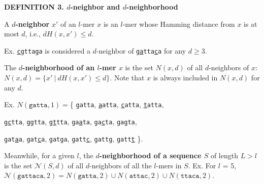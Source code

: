 \documentclass[oneside,12pt]{DISCSthesis}
\begin{document}
		\noindent\textbf{\boldmath DEFINITION 3. $d$-neighbor and $d$-neighborhood}
		
		\noindent A {\boldmath\bf $d$-neighbor} $x'$ of an $l$-mer $x$ is an $l$-mer whose Hamming distance from $x$ is at most $d$, i.e., {\boldmath $dH (x, x') \leq d$}.

		\noindent \hspace*{35pt} Ex. \texttt{\ul{cg}tta\ul{g}a} is considered a $d$-neighbor of \texttt{\ul{ga}tta\ul{c}a} for any $d \geq 3$.\newline

		\noindent The \textbf{\boldmath $d$-neighborhood of an $l$-mer $x$} is the set {\boldmath $N(x, d)$} of all $d$-neighbors of $x$: $N(x,d) = \{ x'\ |\ dH(x, x') \leq d\}$. Note that $x$ is always included in $N(x,d)$ for any $d$.\newline
		
		\noindent\begin{minipage}{\textwidth} {
				\noindent\hspace*{35pt} Ex. $N(\texttt{gatta}, 1) =$\{ \texttt{gatta},
					\texttt{\ul{a}atta}, \texttt{\ul{c}atta}, \texttt{\ul{t}atta},				
					
					\hspace*{150pt}\texttt{g\ul{c}tta}, \texttt{g\ul{g}tta}, \texttt{g\ul{t}tta},
					\texttt{ga\ul{a}ta}, \texttt{ga\ul{c}ta}, \texttt{ga\ul{g}ta},

				 	\hspace*{150pt}\texttt{gat\ul{a}a}, \texttt{gat\ul{c}a}, \texttt{gat\ul{g}a},
				 	\texttt{gatt\ul{c}}, \texttt{gatt\ul{g}}, \texttt{gatt\ul{t}} \}.

		}\end{minipage}\newline

		\noindent Meanwhile, for a given $l$, the \textbf{\boldmath $d$-neighborhood of a sequence $S$} of length $L > l$ is the set {\boldmath $\mathcal{N}(S, d)$} of all $d$-neighbors of all the $l$-mers in $S$.
		\newline\hspace*{35pt} Ex. For $l$ = 5,
			$\mathcal{N}(\texttt{gattaca}, 2) 
					= N(\texttt{gatta}, 2) \cup 
						N(\texttt{attac}, 2) \cup
						N(\texttt{ttaca}, 2)$.\newline
		
\end{document}

